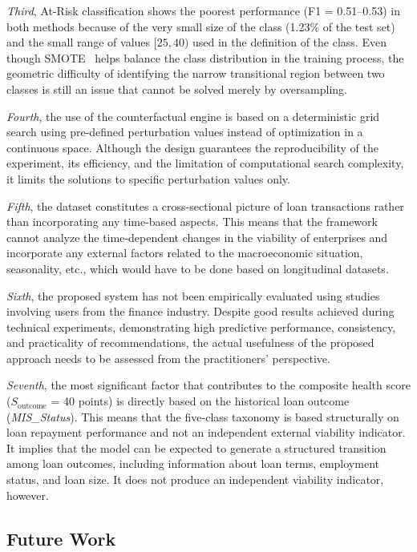 \textit{Third}, At-Risk classification shows the poorest performance (F1 = 0.51--0.53) in both methods because of the very small size of the class (1.23\% of the test set) and the small range of values $[25, 40)$ used in the definition of the class. Even though SMOTE~\cite{12} helps balance the class distribution in the training process, the geometric difficulty of identifying the narrow transitional region between two classes is still an issue that cannot be solved merely by oversampling.

\textit{Fourth}, the use of the counterfactual engine is based on a deterministic grid search using pre-defined perturbation values instead of optimization in a continuous space. Although the design guarantees the reproducibility of the experiment, its efficiency, and the limitation of computational search complexity, it limits the solutions to specific perturbation values only.

\textit{Fifth}, the dataset constitutes a cross-sectional picture of loan transactions rather than incorporating any time-based aspects. This means that the framework cannot analyze the time-dependent changes in the viability of enterprises and incorporate any external factors related to the macroeconomic situation, seasonality, etc., which would have to be done based on longitudinal datasets.

\textit{Sixth}, the proposed system has not been empirically evaluated using studies involving users from the finance industry. Despite good results achieved during technical experiments, demonstrating high predictive performance, consistency, and practicality of recommendations, the actual usefulness of the proposed approach needs to be assessed from the practitioners' perspective.

\textit{Seventh}, the most significant factor that contributes to the composite health score ($S_{\text{outcome}}$ = 40 points) is directly based on the historical loan outcome (\textit{MIS\_Status}). This means that the five-class taxonomy is based structurally on loan repayment performance and not an independent external viability indicator. It implies that the model can be expected to generate a structured transition among loan outcomes, including information about loan terms, employment status, and loan size. It does not produce an independent viability indicator, however.

\subsection{Future Work}

